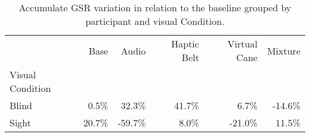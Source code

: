 
\begin{table}[!htb]
\centering
\caption{Accumulate GSR variation in relation to the baseline grouped by participant and visual Condition.}
\label{tab:gsr_var_sum_group}
\begin{tabular}{lrrrrr}
\toprule
{} &    Base &    Audio & Haptic Belt & Virtual Cane &  Mixture \\
Visual Condition &         &          &             &              &          \\
\midrule
Blind            &   0.5\% &   32.3\% &      41.7\% &        6.7\% &  -14.6\% \\
Sight            &  20.7\% &  -59.7\% &       8.0\% &      -21.0\% &   11.5\% \\
\bottomrule
\end{tabular}
\end{table}

